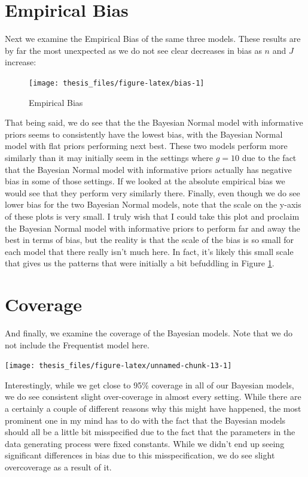\documentclass[12pt,twoside]{reedthesis}
\begin{document}
\hypertarget{empirical-bias}{%
\section{Empirical Bias}\label{empirical-bias}}

Next we examine the Empirical Bias of the same three models. These results are by far the most unexpected as we do not see clear decreases in bias as \(n\) and \(J\) increase:
\begin{figure}

{\centering \texttt{[image: thesis\_files/figure-latex/bias-1]} 

}

\caption{Empirical Bias}\label{fig:bias}
\end{figure}
That being said, we do see that the the Bayesian Normal model with informative priors seems to consistently have the lowest bias, with the Bayesian Normal model with flat priors performing next best. These two models perform more similarly than it may initially seem in the settings where \(g = 10\) due to the fact that the Bayesian Normal model with informative priors actually has negative bias in some of those settings. If we looked at the absolute empirical bias we would see that they perform very similarly there. Finally, even though we do see lower bias for the two Bayesian Normal models, note that the scale on the y-axis of these plots is very small. I truly wish that I could take this plot and proclaim the Bayesian Normal model with informative priors to perform far and away the best in terms of bias, but the reality is that the scale of the bias is so small for each model that there really isn't much here. In fact, it's likely this small scale that gives us the patterns that were initially a bit befuddling in Figure \ref{fig:bias}.

\hypertarget{coverage}{%
\section{Coverage}\label{coverage}}

And finally, we examine the coverage of the Bayesian models. Note that we do not include the Frequentist model here.
\begin{center}\texttt{[image: thesis\_files/figure-latex/unnamed-chunk-13-1]} \end{center}

Interestingly, while we get close to 95\% coverage in all of our Bayesian models, we do see consistent slight over-coverage in almost every setting. While there are a certainly a couple of different reasons why this might have happened, the most prominent one in my mind has to do with the fact that the Bayesian models should all be a little bit misspecified due to the fact that the parameters in the data generating process were fixed constants. While we didn't end up seeing significant differences in bias due to this misspecification, we do see slight overcoverage as a result of it.
\end{document}
